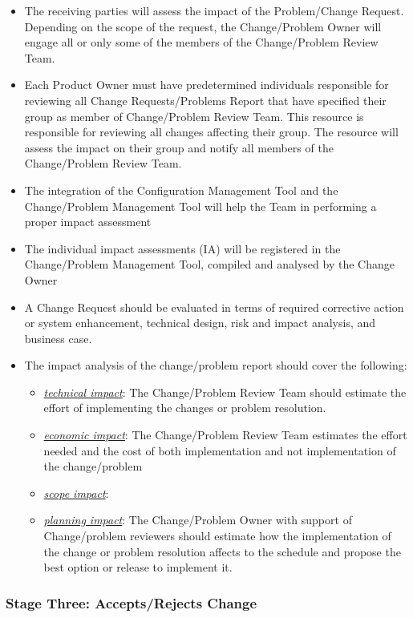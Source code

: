 \documentclass{template/openetcs_article}
\begin{document}
\begin{itemize}
\item The receiving parties will assess the impact of the Problem/Change Request. Depending on the scope of the request, the Change/Problem Owner will engage all or only some of the members of the Change/Problem Review Team. 
\item Each Product Owner must have predetermined individuals responsible for reviewing all Change Requests/Problems Report that have specified their group as member of Change/Problem Review Team. This resource is responsible for reviewing all changes affecting their group. The resource will assess the impact on their group and notify all members of the Change/Problem Review Team.
\item The integration of the Configuration Management Tool and the Change/Problem Management Tool will help the Team in performing a proper impact assessment
\item The individual impact assessments (IA) will be registered in the Change/Problem Management Tool, compiled and analysed by the Change Owner
\item A Change Request should be evaluated in terms of required corrective action or system enhancement, technical design, risk and impact analysis, and business case.
\item The impact analysis of the change/problem report should cover the following:
\begin{itemize}
\item \underline{\it technical impact}: The Change/Problem Review Team  should estimate the effort of implementing the changes or problem resolution. 
\item \underline{\it economic impact}: The Change/Problem Review Team  estimates the effort needed and the cost of both implementation and not implementation of the change/problem
\item \underline{\it scope impact}: 
\item \underline{\it planning impact}: The Change/Problem Owner with support of Change/problem reviewers should estimate how the implementation of the change or problem resolution affects to the schedule and propose the best option or release to implement it.
\end{itemize} 
\end{itemize}

\subsubsection{Stage Three: Accepts/Rejects Change}
\end{document}
